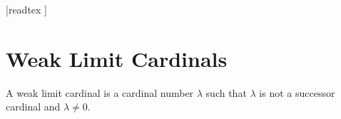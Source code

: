 \documentclass[10pt]{article}
\begin{document}
  \begin{imports}
    \begin{forthel}
      [readtex ]
    \end{forthel}
  \end{imports}


  \section*{Weak Limit Cardinals}

  \begin{forthel}
    \begin{definition}[id=SET_THEORY_06_8945210236547450,printid]
      A weak limit cardinal is a cardinal number $\lambda$ such that $\lambda$ is not a successor cardinal and $\lambda \neq 0$.
    \end{definition}
  \end{forthel}
\end{document}
